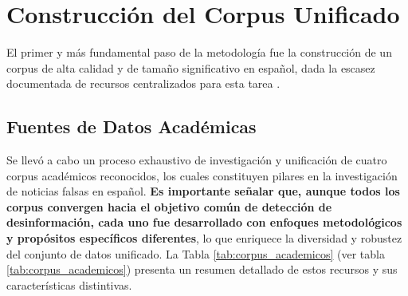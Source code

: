 \section{Construcción del Corpus Unificado}
\label{sec:construccion_corpus}

El primer y más fundamental paso de la metodología fue la construcción de un corpus de alta calidad y de tamaño significativo en español, dada la escasez documentada de recursos centralizados para esta tarea \cite{hu2022deep}.


\subsection{Fuentes de Datos Académicas}

Se llevó a cabo un proceso exhaustivo de investigación y unificación de cuatro corpus académicos reconocidos, los cuales constituyen pilares en la investigación de noticias falsas en español. \textbf{Es importante señalar que, aunque todos los corpus convergen hacia el objetivo común de detección de desinformación, cada uno fue desarrollado con enfoques metodológicos y propósitos específicos diferentes}, lo que enriquece la diversidad y robustez del conjunto de datos unificado. La Tabla \ref{tab:corpus_academicos} (ver tabla \ref{tab:corpus_academicos}) presenta un resumen detallado de estos recursos y sus características distintivas.

